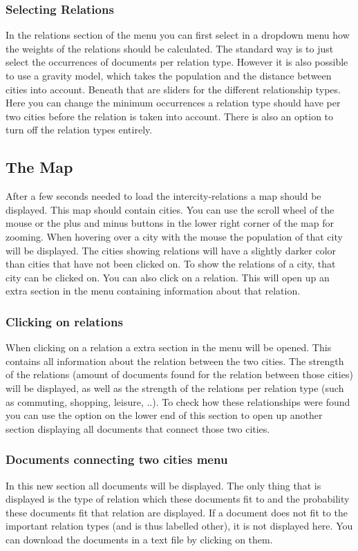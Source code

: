 \subsubsection{Selecting Relations}
In the relations section of the menu you can first select in a dropdown menu how the weights of the relations should be calculated. The standard way is to just select the occurrences of documents per relation type. However it is also possible to use a gravity model, which takes the population and the distance between cities into account.  Beneath that are sliders for the different relationship types. Here you can change the minimum occurrences a relation type should have per two cities before the relation is taken into account. There is also an option to turn off the relation types entirely.


\subsection{The Map}
After a few seconds needed to load the intercity-relations a map should be displayed. This map should contain cities. You can use the scroll wheel of the mouse or the plus and minus buttons in the lower right corner of the map for zooming. When hovering over a city with the mouse the population of that city will be displayed. The cities showing relations will have a slightly darker color than cities that have not been clicked on. To show the relations of a city, that city can be clicked on. You can also click on a relation. This will open up an extra section in the menu containing information about that relation.

\subsubsection{Clicking on relations}
When clicking on a relation a extra section in the menu will be opened. This contains all information about the relation between the two cities. The strength of the relations (amount of documents found for the relation between those cities) will be displayed, as well as the strength of the relations per relation type (such as commuting, shopping, leisure, ..). To check how these relationships were found you can use the option on the lower end of this section to open up another section displaying all documents that connect those two cities.

\subsubsection{Documents connecting two cities menu}
In this new section all documents will be displayed. The only thing that is displayed is the type of relation which these documents fit to and the probability these documents fit that relation are displayed. If a document does not fit to the important relation types (and is thus labelled other), it is not displayed here. You can download the documents in a text file by clicking on them.


